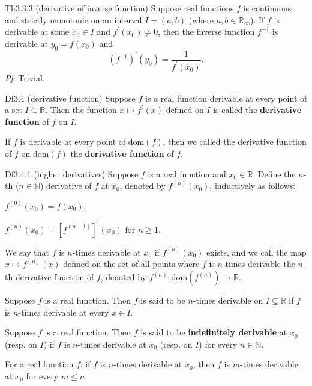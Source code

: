 \documentclass{article}
\begin{document}
\begin{Th}{Th3.3.3 (derivative of inverse function)}
    Suppose real functions $f$ is continuous and strictly monotonic on an interval $I = (a,b)$ (where $a, b\in\mathbb{R}_\infty$). If $f$ is derivable at some $x_0\in I$ and $f^\prime(x_0)\neq 0$, then the inverse function $f^{-1}$ is derivable at $y_0 = f(x_0)$ and
    $$ (f^{-1})^\prime(y_0) = \frac{1}{f^\prime(x_0)}. $$
    \tcblower
    \textit{Pf}: Trivial.
\end{Th}

\begin{Df}{Df3.4 (derivative function)}
    Suppose $f$ is a real function derivable at every point of a set $I\subseteq \mathbb{R}$. Then the function $x\mapsto f^\prime(x)$ defined on $I$ is called the \textbf{derivative function} of $f$ on $I$.
\end{Df}

\begin{Rmk}{}
    \textcolor{Df}{If $f$ is derivable at every point of $\text{dom}(f)$, then we called the derivative function of $f$ on $\text{dom}(f)$ the \textbf{derivative function} of $f$.}
\end{Rmk}

\begin{Df}{Df3.4.1 (higher derivatives)}
    Suppose $f$ is a real function and $x_0\in\mathbb{R}$. Define the $n$-th ($n\in\mathbb{N}$) derivative of $f$ at $x_0$, denoted by $f^{(n)}(x_0)$, inductively as follows:
    \begin{compactenum}
        \item $f^{(0)}(x_0) = f(x_0)$;
        \item $f^{(n)}(x_0) = [f^{(n-1)}]^\prime(x_0)$ for $n\geq 1$.
    \end{compactenum}
    We say that $f$ is $n$-times derivable at $x_0$ if $f^{(n)}(x_0)$ exists, and we call the map $x\mapsto f^{(n)}(x)$ defined on the set of all points where $f$ is $n$-times derivable the $n$-th derivative function of $f$, denoted by $f^{(n)}: \text{dom}(f^{(n)})\rightarrow \mathbb{R}$.
\end{Df}

\begin{Rmk}{}
    \begin{compactenum}
        \item \textcolor{Df}{Suppose $f$ is a real function. Then $f$ is said to be $n$-times derivable on $I \subseteq\mathbb{R}$ if $f$ is $n$-times derivable at every $x\in I$.}
        \item \textcolor{Df}{Suppose $f$ is a real function. Then $f$ is said to be \textbf{indefinitely derivable} at $x_0$ (resp. on $I$) if $f$ is $n$-times derivable at $x_0$ (resp. on $I$) for every $n\in\mathbb{N}$.}
        \item \textcolor{Th}{For a real function $f$, if $f$ is $n$-times derivable at $x_0$, then $f$ is $m$-times derivable at $x_0$ for every $m\leq n$.}
    \end{compactenum}
\end{Rmk}
\end{document}
